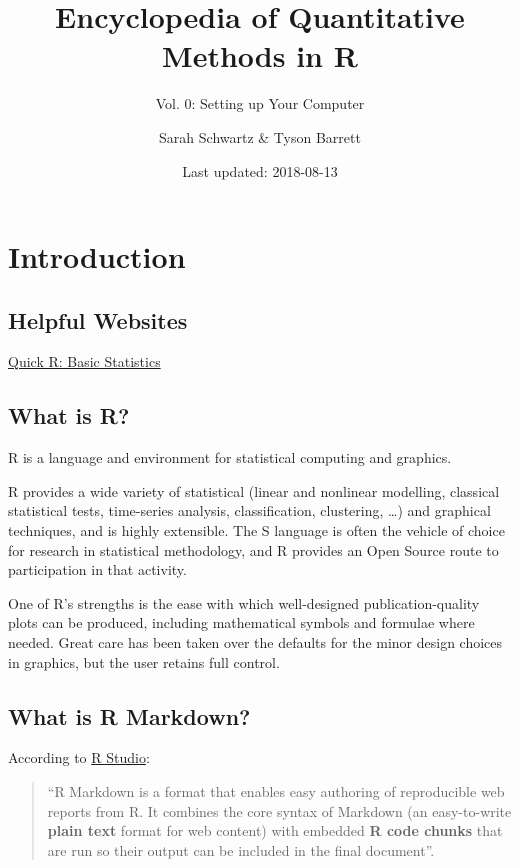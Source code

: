 \documentclass[]{book}
\title{Encyclopedia of Quantitative Methods in R}
\subtitle{Vol. 0: Setting up Your Computer}
\author{Sarah Schwartz \& Tyson Barrett}
\date{Last updated: 2018-08-13}
\theoremstyle{definition}
\theoremstyle{definition}
\theoremstyle{definition}
\theoremstyle{remark}
\begin{document}
\maketitle

{
\setcounter{tocdepth}{1}
\tableofcontents
}
\chapter*{Introduction}\label{introduction}

\section{Helpful Websites}\label{helpful-websites}

\href{https://www.statmethods.net/stats/index.html}{Quick R: Basic
Statistics}

\section{What is R?}\label{what-is-r}

R is a language and environment for statistical computing and graphics.
\citep{R-base}

R provides a wide variety of statistical (linear and nonlinear
modelling, classical statistical tests, time-series analysis,
classification, clustering, \ldots{}) and graphical techniques, and is
highly extensible. The S language is often the vehicle of choice for
research in statistical methodology, and R provides an Open Source route
to participation in that activity.

One of R's strengths is the ease with which well-designed
publication-quality plots can be produced, including mathematical
symbols and formulae where needed. Great care has been taken over the
defaults for the minor design choices in graphics, but the user retains
full control.

\section{What is R Markdown?}\label{what-is-r-markdown}

According to \href{www.rstudio.com}{R Studio}:

\begin{quote}
``R Markdown is a format that enables easy authoring of reproducible web
reports from R. It combines the core syntax of Markdown (an
easy-to-write \textbf{plain text} format for web content) with embedded
\textbf{R code chunks} that are run so their output can be included in
the final document''.
\end{quote}
\end{document}
